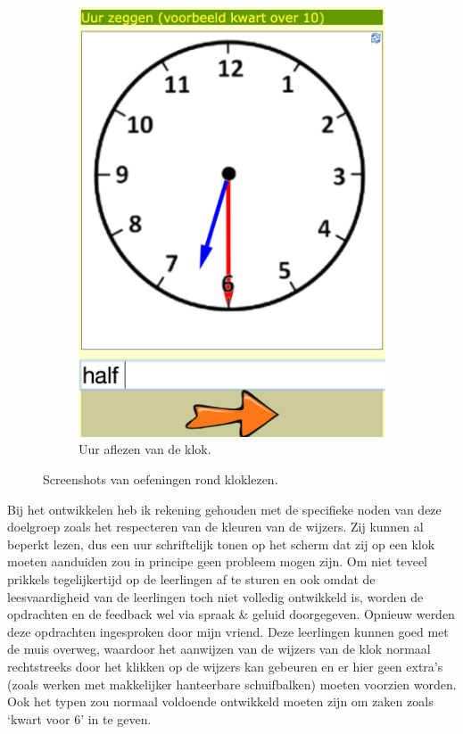 \documentclass[a4paper,11pt]{article}
\theoremstyle{definition}
\begin{document}
\begin{itemize}
\begin{itemize}
\begin{figure}[h!]
\begin{subfigure}{.5\textwidth}
                \includegraphics[scale=0.15]{klok2.jpg}
                \caption{Uur aflezen van de klok.}
                \label{klok2}
        \end{subfigure}
           \caption{Screenshots van oefeningen rond kloklezen.}
\end{figure}

\noindent Bij het ontwikkelen heb ik rekening gehouden met de specifieke noden 
van deze doelgroep zoals het respecteren van de kleuren van de wijzers. Zij 
kunnen al beperkt lezen, dus een uur schriftelijk tonen op het scherm dat zij op 
een klok moeten aanduiden zou in principe geen probleem mogen zijn. Om niet 
teveel prikkels tegelijkertijd op de leerlingen af te sturen en ook omdat de leesvaardigheid van de leerlingen toch niet volledig ontwikkeld is, worden de 
opdrachten en de feedback wel via spraak \& geluid doorgegeven. Opnieuw werden deze opdrachten ingesproken door mijn vriend. Deze leerlingen 
kunnen goed met de muis overweg, waardoor het aanwijzen van de wijzers van de 
klok normaal rechtstreeks door het klikken op de wijzers kan gebeuren en er hier 
geen extra's (zoals werken met makkelijker hanteerbare schuifbalken) moeten voorzien worden. 
Ook het typen zou normaal voldoende ontwikkeld moeten zijn om zaken zoals `kwart 
voor 6' in te geven.\\
 

\end{itemize}
\end{itemize}
\end{document}
